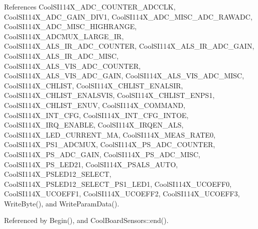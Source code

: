References Cool\+S\+I114\+X\+\_\+\+A\+D\+C\+\_\+\+C\+O\+U\+N\+T\+E\+R\+\_\+A\+D\+C\+C\+LK, Cool\+S\+I114\+X\+\_\+\+A\+D\+C\+\_\+\+G\+A\+I\+N\+\_\+\+D\+I\+V1, Cool\+S\+I114\+X\+\_\+\+A\+D\+C\+\_\+\+M\+I\+S\+C\+\_\+\+A\+D\+C\+\_\+\+R\+A\+W\+A\+DC, Cool\+S\+I114\+X\+\_\+\+A\+D\+C\+\_\+\+M\+I\+S\+C\+\_\+\+H\+I\+G\+H\+R\+A\+N\+GE, Cool\+S\+I114\+X\+\_\+\+A\+D\+C\+M\+U\+X\+\_\+\+L\+A\+R\+G\+E\+\_\+\+IR, Cool\+S\+I114\+X\+\_\+\+A\+L\+S\+\_\+\+I\+R\+\_\+\+A\+D\+C\+\_\+\+C\+O\+U\+N\+T\+ER, Cool\+S\+I114\+X\+\_\+\+A\+L\+S\+\_\+\+I\+R\+\_\+\+A\+D\+C\+\_\+\+G\+A\+IN, Cool\+S\+I114\+X\+\_\+\+A\+L\+S\+\_\+\+I\+R\+\_\+\+A\+D\+C\+\_\+\+M\+I\+SC, Cool\+S\+I114\+X\+\_\+\+A\+L\+S\+\_\+\+V\+I\+S\+\_\+\+A\+D\+C\+\_\+\+C\+O\+U\+N\+T\+ER, Cool\+S\+I114\+X\+\_\+\+A\+L\+S\+\_\+\+V\+I\+S\+\_\+\+A\+D\+C\+\_\+\+G\+A\+IN, Cool\+S\+I114\+X\+\_\+\+A\+L\+S\+\_\+\+V\+I\+S\+\_\+\+A\+D\+C\+\_\+\+M\+I\+SC, Cool\+S\+I114\+X\+\_\+\+C\+H\+L\+I\+ST, Cool\+S\+I114\+X\+\_\+\+C\+H\+L\+I\+S\+T\+\_\+\+E\+N\+A\+L\+S\+IR, Cool\+S\+I114\+X\+\_\+\+C\+H\+L\+I\+S\+T\+\_\+\+E\+N\+A\+L\+S\+V\+IS, Cool\+S\+I114\+X\+\_\+\+C\+H\+L\+I\+S\+T\+\_\+\+E\+N\+P\+S1, Cool\+S\+I114\+X\+\_\+\+C\+H\+L\+I\+S\+T\+\_\+\+E\+N\+UV, Cool\+S\+I114\+X\+\_\+\+C\+O\+M\+M\+A\+ND, Cool\+S\+I114\+X\+\_\+\+I\+N\+T\+\_\+\+C\+FG, Cool\+S\+I114\+X\+\_\+\+I\+N\+T\+\_\+\+C\+F\+G\+\_\+\+I\+N\+T\+OE, Cool\+S\+I114\+X\+\_\+\+I\+R\+Q\+\_\+\+E\+N\+A\+B\+LE, Cool\+S\+I114\+X\+\_\+\+I\+R\+Q\+E\+N\+\_\+\+A\+LS, Cool\+S\+I114\+X\+\_\+\+L\+E\+D\+\_\+\+C\+U\+R\+R\+E\+N\+T\+\_\+MA, Cool\+S\+I114\+X\+\_\+\+M\+E\+A\+S\+\_\+\+R\+A\+T\+E0, Cool\+S\+I114\+X\+\_\+\+P\+S1\+\_\+\+A\+D\+C\+M\+UX, Cool\+S\+I114\+X\+\_\+\+P\+S\+\_\+\+A\+D\+C\+\_\+\+C\+O\+U\+N\+T\+ER, Cool\+S\+I114\+X\+\_\+\+P\+S\+\_\+\+A\+D\+C\+\_\+\+G\+A\+IN, Cool\+S\+I114\+X\+\_\+\+P\+S\+\_\+\+A\+D\+C\+\_\+\+M\+I\+SC, Cool\+S\+I114\+X\+\_\+\+P\+S\+\_\+\+L\+E\+D21, Cool\+S\+I114\+X\+\_\+\+P\+S\+A\+L\+S\+\_\+\+A\+U\+TO, Cool\+S\+I114\+X\+\_\+\+P\+S\+L\+E\+D12\+\_\+\+S\+E\+L\+E\+CT, Cool\+S\+I114\+X\+\_\+\+P\+S\+L\+E\+D12\+\_\+\+S\+E\+L\+E\+C\+T\+\_\+\+P\+S1\+\_\+\+L\+E\+D1, Cool\+S\+I114\+X\+\_\+\+U\+C\+O\+E\+F\+F0, Cool\+S\+I114\+X\+\_\+\+U\+C\+O\+E\+F\+F1, Cool\+S\+I114\+X\+\_\+\+U\+C\+O\+E\+F\+F2, Cool\+S\+I114\+X\+\_\+\+U\+C\+O\+E\+F\+F3, Write\+Byte(), and Write\+Param\+Data().



Referenced by Begin(), and Cool\+Board\+Sensors\+::end().

